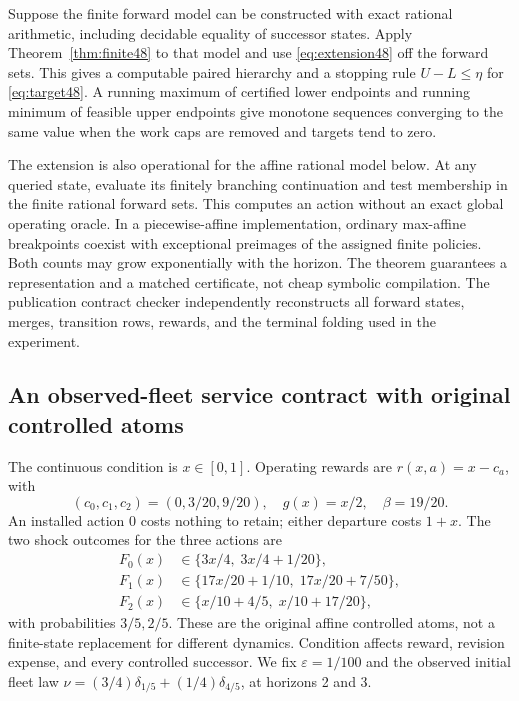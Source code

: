 \begin{corollary}\label{cor:continuum48}
Suppose the finite forward model can be constructed with exact rational arithmetic, including decidable equality of successor states. Apply Theorem~\ref{thm:finite48} to that model and use \eqref{eq:extension48} off the forward sets. This gives a computable paired hierarchy and a stopping rule $U-L\le\eta$ for \eqref{eq:target48}. A running maximum of certified lower endpoints and running minimum of feasible upper endpoints give monotone sequences converging to the same value when the work caps are removed and targets tend to zero.
\end{corollary}

The extension is also operational for the affine rational model below. At any queried state, evaluate its finitely branching continuation and test membership in the finite rational forward sets. This computes an action without an exact global operating oracle. In a piecewise-affine implementation, ordinary max-affine breakpoints coexist with exceptional preimages of the assigned finite policies. Both counts may grow exponentially with the horizon. The theorem guarantees a representation and a matched certificate, not cheap symbolic compilation. The publication contract checker independently reconstructs all forward states, merges, transition rows, rewards, and the terminal folding used in the experiment.

\subsection{An observed-fleet service contract with original controlled atoms}
The continuous condition is $x\in[0,1]$. Operating rewards are $r(x,a)=x-c_a$, with
\[
 (c_0,c_1,c_2)=(0,3/20,9/20),\quad g(x)=x/2,\quad\beta=19/20.
\]
An installed action $0$ costs nothing to retain; either departure costs $1+x$. The two shock outcomes for the three actions are
\begin{align*}
 F_{0}(x)&\in\{3x/4,\;3x/4+1/20\},\\
 F_{1}(x)&\in\{17x/20+1/10,\;17x/20+7/50\},\\
 F_{2}(x)&\in\{x/10+4/5,\;x/10+17/20\},
\end{align*}
with probabilities $3/5,2/5$. These are the original affine controlled atoms, not a finite-state replacement for different dynamics. Condition affects reward, revision expense, and every controlled successor. We fix $\varepsilon=1/100$ and the observed initial fleet law $\nu=(3/4)\delta_{1/5}+(1/4)\delta_{4/5}$, at horizons 2 and 3.

